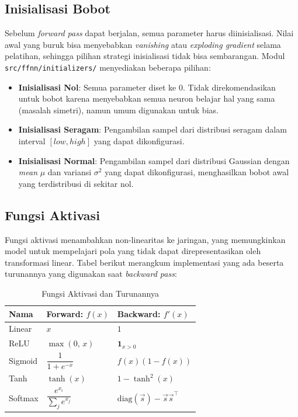 \subsection{Inisialisasi Bobot}

Sebelum \textit{forward pass} dapat berjalan, semua parameter harus diinisialisasi. Nilai awal yang buruk bisa menyebabkan \textit{vanishing} atau \textit{exploding gradient} selama pelatihan, sehingga pilihan strategi inisialisasi tidak bisa sembarangan. Modul \texttt{src/ffnn/initializers/} menyediakan beberapa pilihan:

\begin{itemize}
    \item \textbf{Inisialisasi Nol}: Semua parameter diset ke 0. Tidak direkomendasikan untuk bobot karena menyebabkan semua neuron belajar hal yang sama (masalah simetri), namun umum digunakan untuk bias.
    \item \textbf{Inisialisasi Seragam}: Pengambilan sampel dari distribusi seragam dalam interval $[low, high]$ yang dapat dikonfigurasi.
    \item \textbf{Inisialisasi Normal}: Pengambilan sampel dari distribusi Gaussian dengan \textit{mean} $\mu$ dan variansi $\sigma^2$ yang dapat dikonfigurasi, menghasilkan bobot awal yang terdistribusi di sekitar nol.
\end{itemize}

\subsection{Fungsi Aktivasi}

Fungsi aktivasi menambahkan non-linearitas ke jaringan, yang memungkinkan model untuk mempelajari pola yang tidak dapat direpresentasikan oleh transformasi linear. Tabel berikut merangkum implementasi yang ada beserta turunannya yang digunakan saat \textit{backward pass}:

\begin{table}[H]
    \centering
    \caption{Fungsi Aktivasi dan Turunannya}
    \begin{tabular}{lll}
        \toprule
        \textbf{Nama} & \textbf{Forward: } $f(x)$ & \textbf{Backward: } $f'(x)$ \\
        \midrule
        Linear   & $x$ & $1$ \\
        ReLU     & $\max(0,\, x)$ & $\mathbf{1}_{x > 0}$ \\
        Sigmoid  & $\dfrac{1}{1 + e^{-x}}$ & $f(x)\left(1 - f(x)\right)$ \\[8pt]
        Tanh     & $\tanh(x)$ & $1 - \tanh^2(x)$ \\[4pt]
        Softmax  & $\dfrac{e^{x_i}}{\sum_j e^{x_j}}$ & $\text{diag}(\vec{s}) - \vec{s}\vec{s}^{\top}$ \\
        \bottomrule
    \end{tabular}
    \label{tab:activation}
\end{table}

